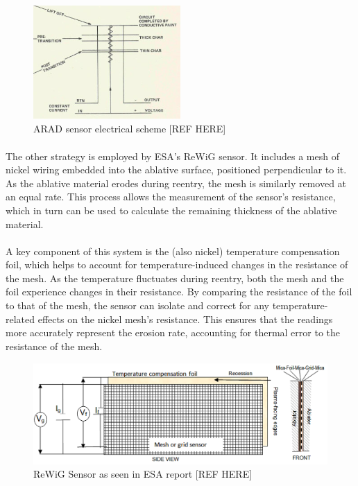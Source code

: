 \documentclass[11pt]{article}
\begin{document}
	\begin{figure}[H]
		\centering
		\includegraphics[width=0.5\textwidth]{ARAD.png}
		\caption{ARAD sensor electrical scheme [REF HERE]}
	\end{figure}
	
	
	\paragraph{}The other strategy is employed by ESA's ReWiG sensor. It includes a mesh of nickel wiring embedded into the ablative surface, positioned perpendicular to it. As the ablative material erodes during reentry, the mesh is similarly removed at an equal rate. This process allows the measurement of the sensor’s resistance, which in turn can be used to calculate the remaining thickness of the ablative material.
	\paragraph{}A key component of this system is the (also nickel) temperature compensation foil, which helps to account for temperature-induced changes in the resistance of the mesh. As the temperature fluctuates during reentry, both the mesh and the foil experience changes in their resistance. By comparing the resistance of the foil to that of the mesh, the sensor can isolate and correct for any temperature-related effects on the nickel mesh’s resistance. This ensures that the readings more accurately represent the erosion rate, accounting for thermal error to the resistance of the mesh.
	
	\begin{figure}[H]
		\centering
		\includegraphics[width=\textwidth]{ReWiG.png}
		\caption{ReWiG Sensor as seen in ESA report [REF HERE]}
	\end{figure}
	
\end{document}
